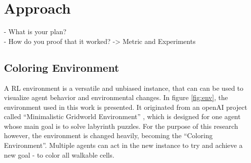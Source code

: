 %
%
\chapter{Approach}\label{sec:Concept}
- What is your plan? \\
- How do you proof that it worked? -> Metric and Experiments


\section{Coloring Environment}\label{env}
A RL environment is a versatile and unbiased instance, that can can be used to visualize agent behavior and environmental changes.
In figure \ref{fig:env}, the environment used in this work is presented. It originated from an openAI project called ``Minimalistic Gridworld Environment'' \cite{chwi18}, which is designed for one agent whose main goal is to solve labyrinth puzzles. For the purpose of this research however, the environment is changed heavily, becoming the ``Coloring Environment''. Multiple agents can act in the new instance to try and achieve a new goal - to color all walkable cells.

